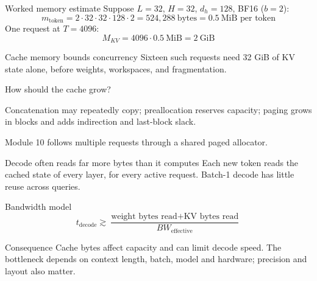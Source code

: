 \documentclass[handout]{beamer}
\begin{document}
\begin{frame}{Worked memory estimate}
  Suppose $L=32$, $H=32$, $d_h=128$, BF16 ($b=2$):
  \[
    m_{\text{token}}=2\cdot32\cdot32\cdot128\cdot2=524{,}288\ \text{bytes}=0.5\ \text{MiB per token}
  \]
  One request at $T=4096$:
  \[
    M_{KV}=4096\cdot0.5\ \text{MiB}=2\ \text{GiB}
  \]
  \begin{alertblock}{Cache memory bounds concurrency}
    Sixteen such requests need 32 GiB of KV state alone, before weights, workspaces, and fragmentation.
  \end{alertblock}
\end{frame}

\begin{frame}{How should the cache grow?}
  \centering
  \par\vspace{6pt}
  \small Concatenation may repeatedly copy; preallocation reserves capacity; paging grows in blocks and adds indirection and last-block slack.
  \par\footnotesize Module 10 follows multiple requests through a shared paged allocator.
\end{frame}

\begin{frame}{Decode often reads far more bytes than it computes}
  Each new token reads the cached state of every layer, for every active request. Batch-1 decode has little reuse across queries.
  \begin{block}{Bandwidth model}
    \[
      t_{\text{decode}}\gtrsim
      \frac{\text{weight bytes read}+\text{KV bytes read}}{BW_{\text{effective}}}
    \]
  \end{block}
  \begin{alertblock}{Consequence}
    Cache bytes affect capacity and can limit decode speed. The bottleneck depends on context length, batch, model and hardware; precision and layout also matter.
  \end{alertblock}
\end{frame}
\end{document}
